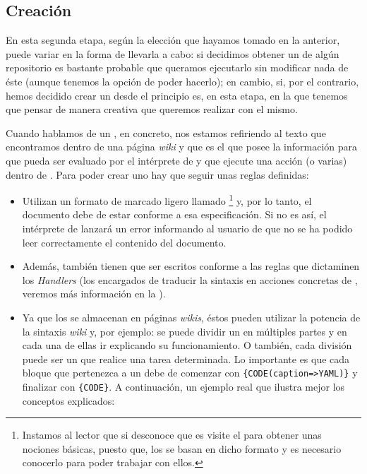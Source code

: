 \subsection{Creación}

En esta segunda etapa, según la elección que hayamos tomado en la anterior, puede variar en la forma de llevarla a cabo: si decidimos obtener un \profile{} de algún repositorio es bastante probable que queramos ejecutarlo sin modificar nada de éste (aunque tenemos la opción de poder hacerlo); en cambio, si, por el contrario, hemos decidido crear un \profile{} desde el principio es, en esta etapa, en la que tenemos que pensar de manera creativa que queremos realizar con el mismo.

Cuando hablamos de un \profile{}, en concreto, nos estamos refiriendo al texto que encontramos dentro de una página \textit{wiki} y que es el que posee la información para que pueda ser evaluado por el intérprete de \profiles{} y que ejecute una acción (o varias) dentro de \tiki{}. Para poder crear uno hay que seguir unas reglas definidas: 

\begin{itemize}
    \item Utilizan un formato de marcado ligero llamado \yaml{}\footnote{Instamos al lector que si desconoce que es \yaml{} visite el  para obtener unas nociones básicas, puesto que, los \profiles{} se basan en dicho formato y es necesario conocerlo para poder trabajar con ellos.} y, por lo tanto, el documento debe de estar conforme a esa especificación. Si no es así, el intérprete de \profiles{} lanzará un error informando al usuario de que no se ha podido leer correctamente el contenido del documento.

    \item Además, también tienen que ser escritos conforme a las reglas que dictaminen los \textit{Handlers} (los encargados de traducir la sintaxis \yaml{} en acciones concretas de \tiki{}, veremos más información en la ).

\item Ya que los \profiles{} se almacenan en páginas \textit{wikis}, éstos pueden utilizar la potencia de la sintaxis \textit{wiki} y, por ejemplo: se puede dividir un \profile{} en múltiples partes y en cada una de ellas ir explicando su funcionamiento. O también, cada división puede ser un \profile{} que realice una tarea determinada. Lo importante es que cada bloque que pertenezca a un \profile{} debe de comenzar con \texttt{\{CODE(caption=>YAML)\}} y finalizar con \texttt{\{CODE\}}. A continuación, un ejemplo real que ilustra mejor los conceptos explicados:
\end{itemize}

